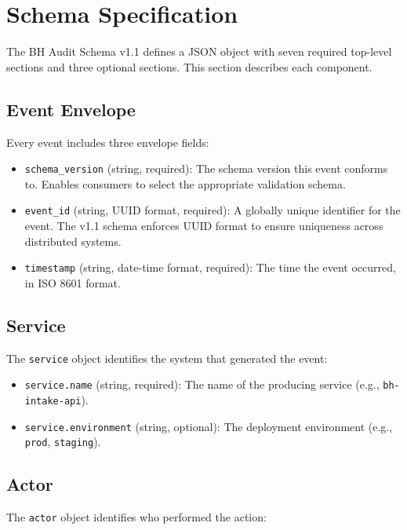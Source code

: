 \documentclass[11pt,a4paper]{article}
\begin{document}
\section{Schema Specification}

The BH Audit Schema v1.1 defines a JSON object with seven required top-level sections and three optional sections. This section describes each component.

\subsection{Event Envelope}

Every event includes three envelope fields:

\begin{itemize}
    \item \texttt{schema\_version} (string, required): The schema version this event conforms to. Enables consumers to select the appropriate validation schema.
    \item \texttt{event\_id} (string, UUID format, required): A globally unique identifier for the event. The v1.1 schema enforces UUID format to ensure uniqueness across distributed systems.
    \item \texttt{timestamp} (string, date-time format, required): The time the event occurred, in ISO 8601 format.
\end{itemize}

\subsection{Service}

The \texttt{service} object identifies the system that generated the event:

\begin{itemize}
    \item \texttt{service.name} (string, required): The name of the producing service (e.g., \texttt{bh-intake-api}).
    \item \texttt{service.environment} (string, optional): The deployment environment (e.g., \texttt{prod}, \texttt{staging}).
\end{itemize}

\subsection{Actor}

The \texttt{actor} object identifies who performed the action:
\end{document}
